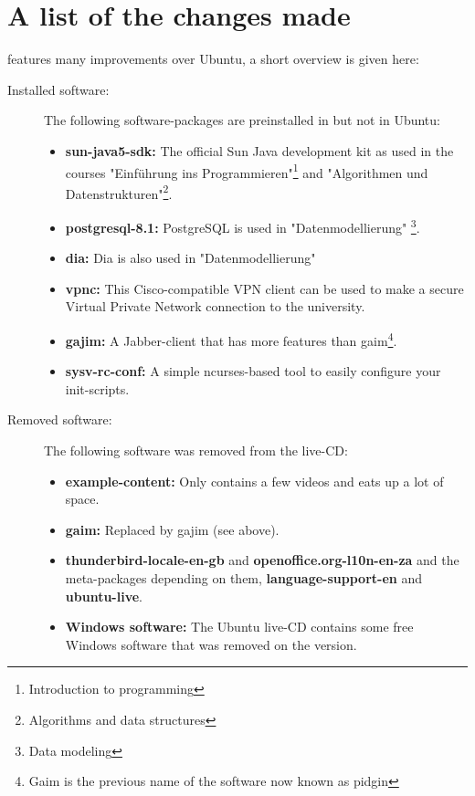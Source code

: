 \section{A list of the changes made}\label{changes-overview}
\tunix features many improvements over Ubuntu, a short overview is given here:
\begin{description}
   \item[Installed software:] The following software-packages are preinstalled in \tunix
   but not in Ubuntu:
     \begin{itemize}
       \item \textbf{sun-java5-sdk:} The official Sun Java development kit as used in
         the courses "Einführung ins Programmieren"\footnote{Introduction to %
	 programming} and "Algorithmen und Datenstrukturen"\footnote{Algorithms
	 and data structures}.
       \item \textbf{postgresql-8.1:} PostgreSQL is used in "Datenmodellierung"
         \footnote{Data modeling}.
       \item \textbf{dia:} Dia is also used in "Datenmodellierung" 
       \item \textbf{vpnc:} This Cisco-compatible VPN client can be used to make a
         secure Virtual Private Network connection to the university.
       \item \textbf{gajim:} A Jabber-client that has more features than
         gaim\footnote{Gaim is the previous name of the software now known as
         pidgin}.
       \item \textbf{sysv-rc-conf:} A simple ncurses-based tool to easily
         configure your init-scripts.
     \end{itemize}
   \item[Removed software:] The following software was removed from the \tunix
   live-CD:
     \begin{itemize}
       \item \textbf{example-content:} Only contains a few videos and eats up a
         lot of space.
       \item \textbf{gaim:} Replaced by gajim (see above).
       \item \textbf{thunderbird-locale-en-gb} and \textbf{openoffice.org-l10n-en-za}
         and the meta-packages depending on them, \textbf{language-support-en} and
	 \textbf{ubuntu-live}.
       \item \textbf{Windows software:} The Ubuntu live-CD contains some free Windows
         software that was removed on the \tunix version.

\end{itemize}
\end{description}

